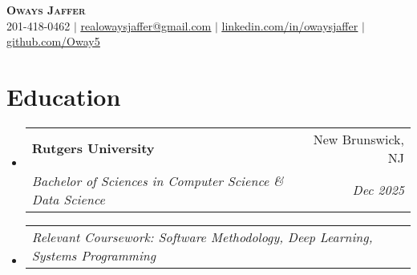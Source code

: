 \documentclass[letterpaper,12pt]{article}
\makeatletter
\newcommand{\resumeSubheading}[4]{
  \vspace{-2pt}\item
    \begin{tabular*}{0.97\textwidth}[t]{l@{\extracolsep{\fill}}r}
      \textbf{#1} & #2 \\
      \textit{\small#3} & \textit{\small #4} \\
    \end{tabular*}\vspace{-7pt}
}
\newcommand{\resumeSubheadingCoursework}[1]{
  \item
    \begin{tabular*}{0.97\textwidth}{l@{\extracolsep{\fill}}r}
      \textit{\small#1} \\
    \end{tabular*}\vspace{-7pt}
}
\newcommand{\resumeSubHeadingListStart}{\begin{itemize}[leftmargin=0.15in, label={}]}
\newcommand{\resumeSubHeadingListEnd}{\end{itemize}}
\makeatother
\begin{document}
\begin{center}
    \textbf{ \scshape Oways Jaffer} \\ \vspace{1pt}
    \small 201-418-0462 $|$ \href{mailto:realowaysjaffer@gmail.com}{\underline{realowaysjaffer@gmail.com}} $|$ 
    \href{https://linkedin.com/in/owaysjaffer}{\underline{linkedin.com/in/owaysjaffer}} $|$
    \href{https://github.com/oway5}{\underline{github.com/Oway5}}
\end{center}


\section{Education}
  \resumeSubHeadingListStart
    \resumeSubheading
      {Rutgers University}{New Brunswick, NJ}
      {Bachelor of Sciences in Computer Science \& Data Science}{Dec 2025}
      \resumeSubheadingCoursework
      {Relevant Coursework: Software Methodology, Deep Learning, Systems Programming}
    
  \resumeSubHeadingListEnd


\end{document}
